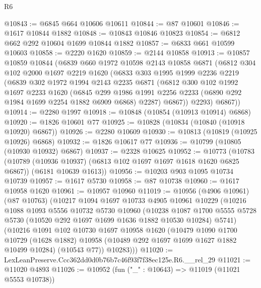 \begin{lexlean}{R6}
\begin{coremodule}
@10843 := @6845 @664 @10606 @10611
@10844 := @87 @10601
@10846 := @1617 @10844 @1882
@10848 := @10843 @10846 @10823
@10854 := @6812 @662 @292 @10604 @1699 @10844 @1882
@10857 := @6833 @661 @10599 @10603
@10858 := @2220 @1620
@10859 := @2144 @10858
@10913 := @10857
    @10859
    @10844
    (@6839
      @660
      @1972
      @10598
      @2143
      @10858
      @6871
      (@6812
        @304
        @102
        @2000
        @1697
        @2219
        @1620
        (@6833
          @303
          @1995
          @1999
          @2236
          @2219
          (@6839
            @302
            @1972
            @1994
            @2143
            @2235
            @6871
            (@6812
              @300
              @102
              @1992
              @1697
              @2233
              @1620
              (@6845
                @299
                @1986
                @1991
                @2256
                @2233
                (@6890 @292 @1984 @1699 @2254 @1882 @6909 @6868)
                @2287)
              @6867))
          @2293)
        @6867))
@10914 := @2280 @1997
@10918 := @10848 (@10854 (@10913 @10914) @6868)
@10920 := @1826 @10601 @77
@10925 := @10828 (@10834 (@10840 (@10918 @10920) @6867))
@10926 := @2280 @10609
@10930 := @10813 (@10819 (@10925 @10926) @6868)
@10932 := @1826 @10617 @77
@10936 := @10799 (@10805 (@10930 @10932) @6867)
@10937 := @2328 @10625
@10952 := @10773
    (@10783
      (@10789 (@10936 @10937) (@6813 @102 @1697 @1697 @1618 @1620 @6825 @6867))
      (@6181 @10639 @1613))
@10956 := @10203 @903 @1095 @10734 @10739
@10957 := @1617 @5730
@10958 := @87 @10738
@10960 := @1617 @10958 @1620
@10961 := @10957 @10960
@11019 := @10956
    (@4906 @10961)
    (@87 @10763)
    (@10217
      @1094
      @1697
      @10733
      @4905
      @10961
      @10229
      (@10216
        @1088
        @1093
        @5556
        @10732
        @5730
        @10960
        (@10238
          @1087
          @1700
          @5555
          @5728
          @5730
          (@10520 @292 @1697 @1699 @1636 @1882 @10530 @10284)
          @5741)
        (@10216
          @1091
          @102
          @10730
          @1697
          @10958
          @1620
          (@10479
            @1090
            @1700
            @10729
            (@1628 @1882)
            @10958
            (@10489 @292 @1697 @1699 @1627 @1882 @10499 @10284)
            (@10543 @77))
          @10283)))
@11020 := LexLeanPreserve.Ccc362dd0d0b76b7c46f93f7f38ec125e.R6.__rel_29
@11021 := @11020 @4893
@11026 := @10952 (fun ("_" : @10643) => @11019 (@11021 @5553 @10738))

\end{coremodule}
\end{lexlean}
